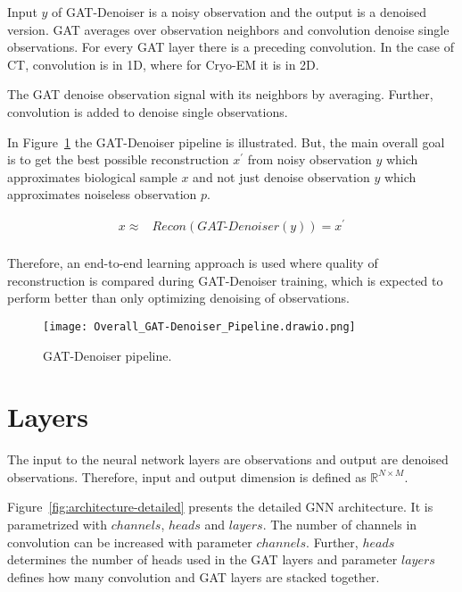 
Input $y$ of GAT-Denoiser is a noisy observation and the output is a denoised version.
GAT averages over observation neighbors and convolution denoise single observations. 
For every GAT layer there is a preceding convolution. 
In the case of CT, convolution is in 1D, where for Cryo-EM it is in 2D.

\begin{tcolorbox}[colback=red!5!white,colframe=red!75!black]
  The GAT denoise observation signal with its neighbors by averaging. 
  Further, convolution is added to denoise single observations.
\end{tcolorbox}

In Figure~\ref{fig:overall-concept} the GAT-Denoiser pipeline is illustrated.
But, the main overall goal is to get the best possible reconstruction $x^{\prime}$ 
from noisy observation $y$ which approximates biological sample $x$ and 
not just denoise observation $y$ which approximates noiseless observation $p$.


\begin{equation}
  \begin{aligned}
    x \approx   &\textit{Recon} \left( \textit{GAT-Denoiser} \left( y \right) \right) = x^{\prime} \\
  \end{aligned}
\end{equation}

Therefore, an end-to-end learning approach is used where quality of reconstruction is 
compared during GAT-Denoiser training, which is expected to perform better than 
only optimizing denoising of observations.

\begin{figure}[H]
  \centering
  \texttt{[image: Overall\_GAT-Denoiser\_Pipeline.drawio.png]}
  \caption{GAT-Denoiser pipeline.}
  \label{fig:overall-concept}
\end{figure}


\section{Layers}
The input to the neural network layers are observations and output are denoised observations.
Therefore, input and output dimension is defined as  $\mathbb{R}^{N \times M}$. 

Figure~\ref{fig:architecture-detailed} presents the detailed GNN architecture.
It is parametrized with $channels$, $heads$ and $layers$. 
The number of channels in convolution can be increased with parameter $channels$.
Further, $heads$ determines the number of heads used in the GAT layers and parameter 
$layers$ defines how many convolution and GAT layers are stacked together.

